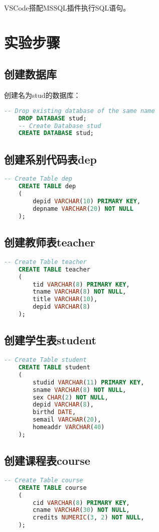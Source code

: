 \documentclass[a4paper]{uestcreport}
\begin{document}
VSCode搭配MSSQL插件执行SQL语句。

\section{实验步骤}
\subsection{创建数据库}
创建名为stud的数据库：
\begin{lstlisting}[language=SQL]
    -- Drop existing database of the same name
    DROP DATABASE stud;
    -- Create Database stud
    CREATE DATABASE stud;
\end{lstlisting}

\subsection{创建系别代码表dep}
\begin{lstlisting}[language=SQL]
    -- Create Table dep
    CREATE TABLE dep
    (
        depid VARCHAR(10) PRIMARY KEY,
        depname VARCHAR(20) NOT NULL
    );
\end{lstlisting}

\subsection{创建教师表teacher}
\begin{lstlisting}[language=SQL]
    -- Create Table teacher
    CREATE TABLE teacher
    (
        tid VARCHAR(8) PRIMARY KEY,
        tname VARCHAR(8) NOT NULL,
        title VARCHAR(10),
        depid VARCHAR(8)
    );
\end{lstlisting}

\subsection{创建学生表student}
\begin{lstlisting}[language=SQL]
    -- Create Table student
    CREATE TABLE student
    (
        studid VARCHAR(11) PRIMARY KEY,
        sname VARCHAR(8) NOT NULL,
        sex CHAR(2) NOT NULL,
        depid VARCHAR(8),
        birthd DATE,
        semail VARCHAR(20),
        homeaddr VARCHAR(40)
    );
\end{lstlisting}

\subsection{创建课程表course}
\begin{lstlisting}[language=SQL]
    -- Create Table course
    CREATE TABLE course
    (
        cid VARCHAR(8) PRIMARY KEY,
        cname VARCHAR(30) NOT NULL,
        credits NUMERIC(3, 2) NOT NULL,
    );
\end{lstlisting}
\end{document}
